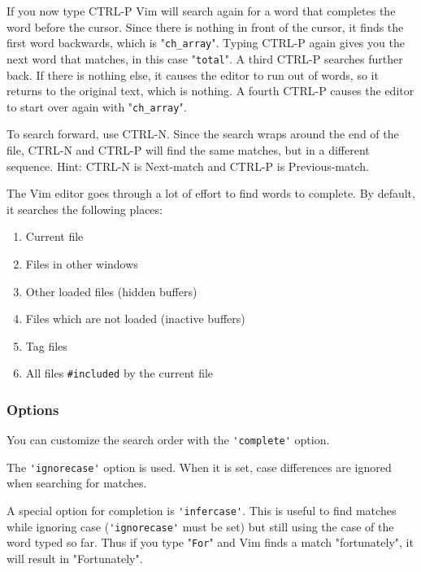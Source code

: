 If you now type CTRL-P Vim will search again for a word that completes the word before the cursor.
Since there is nothing in front of the cursor, it finds the first word backwards, which is "\verb!ch_array!".
Typing CTRL-P again gives you the next word that matches, in this case "\verb!total!".
A third CTRL-P searches further back.
If there is nothing else, it causes the editor to run out of words, so it returns to the original text, which is nothing.
A fourth CTRL-P causes the editor to start over again with "\verb!ch_array!".

To search forward, use CTRL-N.
Since the search wraps around the end of the file, CTRL-N and CTRL-P will find the same matches, but in a different sequence.
Hint: CTRL-N is Next-match and CTRL-P is Previous-match.

The Vim editor goes through a lot of effort to find words to complete.
By default, it searches the following places:
\begin{enumerate}
				\item Current file
				\item Files in other windows
				\item Other loaded files (hidden buffers)
				\item Files which are not loaded (inactive buffers)
				\item Tag files
				\item All files \verb!#included! by the current file
\end{enumerate}
\subsubsection{Options}
You can customize the search order with the \verb!'complete'! option.

The \verb!'ignorecase'! option is used.
When it is set, case differences are ignored when searching for matches.

A special option for completion is \verb!'infercase'!.
This is useful to find matches while ignoring case (\verb!'ignorecase'! must be set) but still using the case of the word typed so far.
Thus if you type "\verb!For!" and Vim finds a match "fortunately", it will result in "Fortunately".
